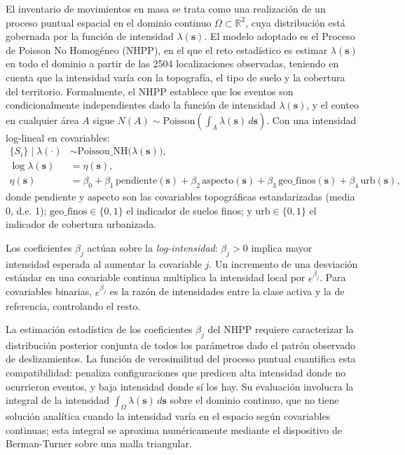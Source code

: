 \documentclass[12pt, a4paper]{article}
\begin{document}
El inventario de movimientos en masa se
trata como una realización de un proceso puntual espacial en el dominio continuo
$\Omega \subset \mathbb{R}^2$, cuya distribución está gobernada por la función de
intensidad $\lambda(\mathbf{s})$. El modelo adoptado es el Proceso de Poisson No
Homogéneo (NHPP), en el que el reto estadístico es estimar $\lambda(\mathbf{s})$
en todo el dominio a partir de las \num{2504} localizaciones observadas, teniendo en
cuenta que la intensidad varía con la topografía, el tipo de suelo y la cobertura del
territorio. Formalmente, el NHPP establece que los eventos son
condicionalmente independientes dado la función de intensidad
$\lambda(\mathbf{s})$, y el conteo en cualquier área $A$ sigue
$N(A) \sim \text{Poisson}\!\left(\int_A \lambda(\mathbf{s})\,d\mathbf{s}\right)$.
Con una intensidad log-lineal en covariables:
\begin{align}
  \{S_i\} \mid \lambda(\cdot) &\sim \text{Poisson\_NH}\bigl(\lambda(\mathbf{s})\bigr),
  \label{eq:ipp1}\\
  \log\lambda(\mathbf{s}) &= \eta(\mathbf{s}),
  \label{eq:ipp2}\\
  \eta(\mathbf{s}) &= \beta_0
    + \beta_1\,\text{pendiente}(\mathbf{s})
    + \beta_2\,\text{aspecto}(\mathbf{s})
    + \beta_3\,\text{geo\_finos}(\mathbf{s})
    + \beta_4\,\text{urb}(\mathbf{s}),
  \label{eq:ipp}
\end{align}
donde $\text{pendiente}$ y $\text{aspecto}$ son las covariables
topográficas estandarizadas (media 0, d.e. 1); $\text{geo\_finos} \in \{0,1\}$
el indicador de suelos finos; y $\text{urb} \in \{0,1\}$ el indicador de
cobertura urbanizada.

Los coeficientes $\beta_j$ actúan sobre la \emph{log-intensidad}: $\beta_j > 0$
implica mayor intensidad esperada al aumentar la covariable $j$. Un incremento
de una desviación estándar en una covariable continua multiplica la intensidad
local por $e^{\beta_j}$. Para covariables binarias, $e^{\beta_j}$ es la razón
de intensidades entre la clase activa y la de referencia, controlando el resto.

La estimación estadística de los coeficientes $\beta_j$ del NHPP requiere
caracterizar la distribución posterior conjunta de todos los parámetros dado el
patrón observado de deslizamientos. La función de verosimilitud del proceso puntual
cuantifica esta compatibilidad: penaliza configuraciones que predicen alta
intensidad donde no ocurrieron eventos, y baja intensidad donde sí los hay. Su
evaluación involucra la integral de la intensidad
$\int_\Omega \lambda(\mathbf{s})\,d\mathbf{s}$ sobre el dominio continuo, que no
tiene solución analítica cuando la intensidad varía en el espacio según covariables
continuas; esta integral se aproxima numéricamente mediante el dispositivo de
Berman-Turner \citep{diggle2013} sobre una malla triangular.
\end{document}
